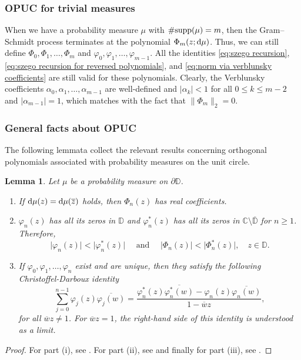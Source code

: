 \documentclass[reqno, a4paper]{amsart}
\def\C{\mathbb{C}}
\def\supp{{\rm supp}}
\renewcommand{\d}{\text{\rm d}}
\newcommand{\dD}{\partial\mathbb{D}}
\theoremstyle{plain}
\newtheorem{lemma}[theorem]{Lemma}
\theoremstyle{definition}
\theoremstyle{remarkstyle}
\numberwithin{equation}{section}
\begin{document}
\subsubsection{OPUC for trivial measures} When we have a probability measure $\mu$ with $\#\supp(\mu)=m$, then the Gram--Schmidt process terminates at the polynomial $\Phi_m(z;\d\mu)$. Thus, we can still define $\Phi_0, \Phi_1, \ldots, \Phi_m$ and $\varphi_0, \varphi_1, \ldots, \varphi_{m-1}$. All the identities \eqref{eq:szego recursion}, \eqref{eq:szego recursion for reversed polynomials}, and \eqref{eq:norm via verblunsky coefficients} are still valid for these polynomials. Clearly, the Verblunsky coefficients $\alpha_0, \alpha_1, \ldots, \alpha_{m-1}$ are well-defined and $|\alpha_k|<1$ for all $0\leq k\leq m-2$ and $|\alpha_{m-1}|=1$, which matches with the fact that $\lVert \Phi_{m}\rVert_2=0$.

\subsubsection{General facts about OPUC}
The following lemmata collect the relevant results concerning orthogonal polynomials associated with probability measures on the unit circle. 

\begin{lemma}\label{lem:properties of orthogonal polynomials}
    Let $\mu$ be a probability measure on $\dD$.
    \begin{enumerate}[label=\textnormal{(\roman*)}]
        \item If $\d\mu(z)=\d\mu(\overline{z})$ holds,  then $\Phi_n(z)$ has real coefficients.
        \item $\varphi_n(z)$ has all its zeros in $\mathbb{D}$ and $\varphi^*_n(z)$ has all its zeros in $\C\setminus\overline{\mathbb{D}}$ for $n \geq 1$. Therefore, 
        \begin{equation*}
            \lvert \varphi_n(z)\rvert <\lvert \varphi_n^*(z)\rvert \quad \text{ and }\quad \lvert \Phi_n(z)\rvert <\lvert \Phi_n^*(z)\rvert, \quad z\in \mathbb{D}.
        \end{equation*}
        \item If $\varphi_0, \varphi_1, \ldots, \varphi_n$ exist and are unique, then they satisfy the following Christoffel-Darboux identity
        \begin{equation*}
            \sum_{j=0}^{n-1} \varphi_j(z)\overline{\varphi_j(w)}=\frac{\varphi_n^*(z)\overline{\varphi_n^*(w)}-\varphi_n(z)\overline{\varphi_n(w)}}{1-\overline{w}z},
        \end{equation*}
        for all $\overline{w}z\neq 1$. For $\overline{w}z=1$, the right-hand side of this identity is understood as a limit.
    \end{enumerate}
\end{lemma}
\begin{proof}
 For part (i), see \cite[Lemma 25]{CarneiroExtremalFunctionsBrangesEuclidean2014}. For part (ii), see \cite[$\mathsection 1.7$]{SimonPart1OrthogonalPolynomialsUnitCircle2005} and finally for part (iii), see \cite[Theorem 2.2.7]{SimonPart1OrthogonalPolynomialsUnitCircle2005}.
\end{proof}
\end{document}
